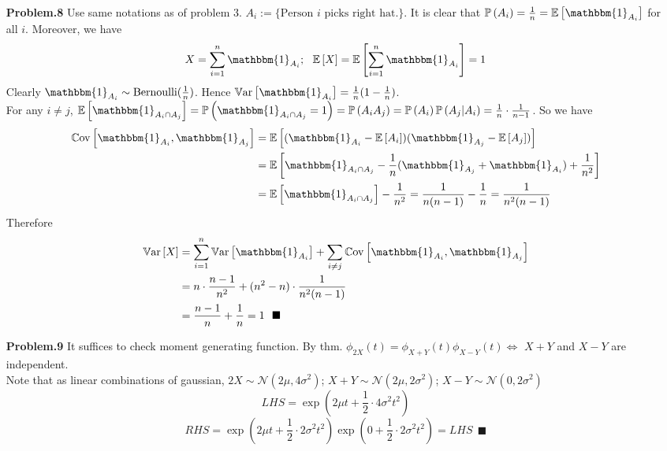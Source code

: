 \documentclass[a4paper, 11pt]{article}
\begin{document}
\begin{itemize}
	\item[\textbf{Problem.8}] Use same notations as of problem 3. $A_i:=\{\text{Person $i$ picks right hat.}\}$. It is clear that $\mathbb{P}\left(A_i\right)=\frac{1}{n}=\mathbb{E}\left[\mathbbm{1}_{A_i} \right]$ for all $i$. Moreover, we have
	$$X=\sum_{i=1}^n\mathbbm{1}_{A_i};~~\mathbb{E}\left[X\right]=\mathbb{E}\left[\sum_{i=1}^n\mathbbm{1}_{A_i}\right]=1$$
	Clearly $\mathbbm{1}_{A_i}\sim \text{Bernoulli}(\frac{1}{n})$. Hence $\mathrm{\mathbb{V}ar}\left[\mathbbm{1}_{A_i}\right]=\frac{1}{n}(1-\frac{1}{n})$. \\
	For any $i\ne j$, $\mathbb{E}\left[\mathbbm{1}_{A_i\cap A_j}\right]=\mathbb{P}\left(\mathbbm{1}_{A_i\cap A_j}=1\right)=\mathbb{P}\left(A_i A_j\right)=\mathbb{P}\left(A_i\right)\mathbb{P}\left(A_j|A_i\right)=\frac{1}{n}\cdot\frac{1}{n-1}$. So we have
	\begin{equation}
		\begin{split}
			\mathrm{\mathbb{C}ov}\left[\mathbbm{1}_{A_i}, \mathbbm{1}_{A_j}\right]&=\mathbb{E}\left[(\mathbbm{1}_{A_i}-\mathbb{E}\left[A_i\right])(\mathbbm{1}_{A_j}-\mathbb{E}\left[A_j\right])\right]\\
			&=\mathbb{E}\left[\mathbbm{1}_{A_i\cap A_j}-\frac{1}{n}(\mathbbm{1}_{A_j}+\mathbbm{1}_{A_i})+\frac{1}{n^2}\right]\\
			&= \mathbb{E}\left[\mathbbm{1}_{A_i\cap A_j}\right]-\frac{1}{n^2}=\frac{1}{n(n-1)}-\frac{1}{n}=\frac{1}{n^2(n-1)}
		\end{split}
	\end{equation}
	Therefore
	\begin{equation}
		\begin{split}
			\mathrm{\mathbb{V}ar}\left[X\right]&=\sum_{i=1}^n \mathrm{\mathbb{V}ar}\left[\mathbbm{1}_{A_i}\right]+\sum_{i\ne j}{\mathrm{\mathbb{C}ov}\left[\mathbbm{1}_{A_i}, \mathbbm{1}_{A_j}\right]}\\
			&=n\cdot \frac{n-1}{n^2}+(n^2-n)\cdot \frac{1}{n^2(n-1)}\\
			& = \frac{n-1}{n}+\frac{1}{n}=1~~\blacksquare
		\end{split}
	\end{equation}
\end{itemize}

\begin{itemize}
	\item[\textbf{Problem.9}] It suffices to check moment generating function. By thm. $\phi_{2X}(t)=\phi_{X+Y}(t)\phi_{X-Y}(t) \iff$ $X+Y$ and $X-Y$ are independent.\\
	Note that as linear combinations of gaussian, $2X\sim \mathcal{N}(2\mu, 4\sigma^2)$; $X+Y\sim \mathcal{N}(2\mu, 2\sigma^2)$; $X-Y\sim \mathcal{N}(0, 2\sigma^2)$
	$$LHS=\exp \left(2\mu t+\frac{1}{2}\cdot 4 \sigma^2t^2\right) $$
	$$RHS=\exp \left(2\mu t+\frac{1}{2}\cdot 2 \sigma^2t^2\right) \exp \left(0+\frac{1}{2}\cdot 2 \sigma^2t^2\right)=LHS~~\blacksquare$$
\end{itemize}
\end{document}
